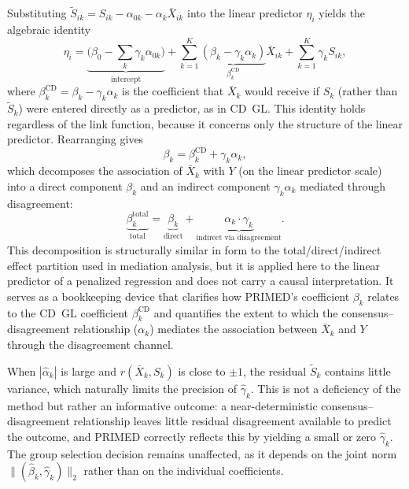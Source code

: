 \documentclass[referee,lineno,pdflatex,sn-vancouver-num]{sn-jnl}
\begin{document}
Substituting $\tilde S_{ik} = S_{ik} - \alpha_{0k} - \alpha_k \bar X_{ik}$ into the linear predictor $\eta_i$ yields the algebraic identity
\[
  \eta_i = \underbrace{\bigl(\beta_0 - \textstyle\sum_k \gamma_k \alpha_{0k}\bigr)}_{\text{intercept}}
         + \sum_{k=1}^K \underbrace{(\beta_k - \gamma_k \alpha_k)}_{\beta_k^{\mathrm{CD}}} \bar X_{ik}
         + \sum_{k=1}^K \gamma_k S_{ik},
\]
where $\beta_k^{\mathrm{CD}} = \beta_k - \gamma_k \alpha_k$ is the coefficient that $\bar X_k$ would receive if $S_k$ (rather than $\tilde S_k$) were entered directly as a predictor, as in CD~GL.
This identity holds regardless of the link function, because it concerns only the structure of the linear predictor.
Rearranging gives
\begin{equation}\label{eq:coef_relation}
  \beta_k = \beta_k^{\mathrm{CD}} + \gamma_k \alpha_k,
\end{equation}
which decomposes the association of $\bar X_k$ with $Y$ (on the linear predictor scale) into a direct component $\beta_k$ and an indirect component $\gamma_k \alpha_k$ mediated through disagreement:
\begin{equation}\label{eq:total_effect}
  \underbrace{\beta_k^{\mathrm{total}}}_{\text{total}} = \underbrace{\beta_k}_{\text{direct}} + \underbrace{\alpha_k \cdot \gamma_k}_{\text{indirect via disagreement}}.
\end{equation}
This decomposition is structurally similar in form to the total/direct/indirect effect partition used in mediation analysis, but it is applied here to the linear predictor of a penalized regression and does not carry a causal interpretation.
It serves as a bookkeeping device that clarifies how PRIMED's coefficient $\beta_k$ relates to the CD~GL coefficient $\beta_k^{\mathrm{CD}}$ and quantifies the extent to which the consensus--disagreement relationship ($\alpha_k$) mediates the association between $\bar X_k$ and $Y$ through the disagreement channel.

When $|\hat\alpha_k|$ is large and $r(\bar X_k, S_k)$ is close to $\pm 1$, the residual $\tilde S_k$ contains little variance, which naturally limits the precision of $\hat\gamma_k$.
This is not a deficiency of the method but rather an informative outcome: a near-deterministic consensus--disagreement relationship leaves little residual disagreement available to predict the outcome, and PRIMED correctly reflects this by yielding a small or zero $\hat\gamma_k$.
The group selection decision remains unaffected, as it depends on the joint norm $\|(\hat\beta_k, \hat\gamma_k)\|_2$ rather than on the individual coefficients.
\end{document}
